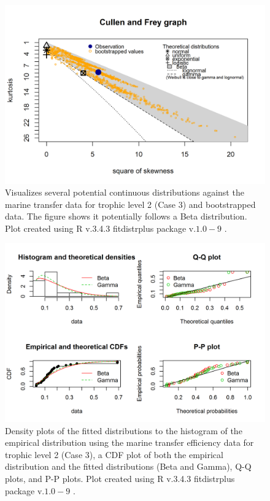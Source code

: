 \documentclass[oneside,12pt,final]{sty/ucthesis-CA2012}
\let\cite\citep                             %
\begin{document}
\begin{mainmatter}
\begin{figure}[H]
     \centering
       \includegraphics[width=.8\textwidth]{fig/cullen_frey_te2}
    \caption{Visualizes several potential continuous distributions against the marine transfer data for trophic level 2 (Case 3) and bootstrapped data. The figure shows it potentially follows a Beta distribution. Plot created using R v.3.4.3 \cite{Rcite} fitdistrplus package v.$1.0-9$ \cite{fitdistrplus}. }
    \label{cf_te2}
\end{figure}

\begin{figure}[H]
     \centering
       \includegraphics[width=.8\textwidth]{fig/gof_te2}
    \caption{Density plots of the fitted distributions to the histogram of the empirical distribution using the marine transfer efficiency data for trophic level 2 (Case 3), a CDF plot of both the empirical distribution and the fitted distributions (Beta and Gamma), Q-Q plots, and P-P plots. Plot created using R v.3.4.3 \cite{Rcite} fitdistrplus package v.$1.0-9$ \cite{fitdistrplus}. }
    \label{gof_te2}
\end{figure}


\end{mainmatter}
\end{document}
